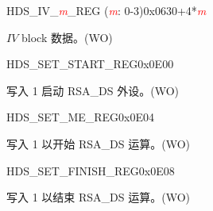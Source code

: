 \begin{register}{H}{DS\_IV\_\textcolor{red}{\it{m}}\_REG (\textcolor{red}{\it{m}}: 0-3)}{0x0630+4*\textcolor{red}{\it{m}}}\label{regdesc:DSIVREG}
%
\regnewline%
\begin{regdesc}\begin{reglist}
\item [DS\_IV\_\textcolor{red}{\it{m}}\_REG (\textcolor{red}{\it{m}}: 0-3)] \begin{math}IV\end{math} block 数据。(WO)
\end{reglist}\end{regdesc}
\end{register}


\begin{register}{H}{DS\_SET\_START\_REG}{0x0E00}\label{regdesc:DSSETSTARTREG}
%
%
\regnewline%
\begin{regdesc}\begin{reglist}
\item [DS\_SET\_START] 写入 1 启动 RSA\_DS 外设。(WO)
\end{reglist}\end{regdesc}
\end{register}


\begin{register}{H}{DS\_SET\_ME\_REG}{0x0E04}\label{regdesc:DSSETMEREG}
%
%
\regnewline%
\begin{regdesc}\begin{reglist}
\item [DS\_SET\_ME] 写入 1 以开始 RSA\_DS 运算。(WO)
\end{reglist}\end{regdesc}
\end{register}


\begin{register}{H}{DS\_SET\_FINISH\_REG}{0x0E08}\label{regdesc:DSSETFINISHREG}
%
%
\regnewline%
\begin{regdesc}\begin{reglist}
\item [DS\_SET\_FINISH] 写入 1 以结束 RSA\_DS 运算。(WO)
\end{reglist}\end{regdesc}
\end{register}



